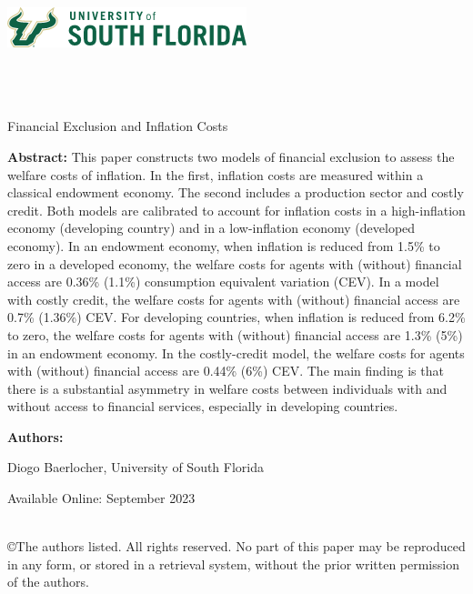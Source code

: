 \documentclass[11pt]{article}
\begin{document}
\onehalfspacing

\noindent \includegraphics{usf_logo.png} \\

\noindent{\color{usfgreen} \rule{0.5\textwidth}{10pt}}{\color{usfgold} \rule{0.5\textwidth}{10pt}}\\

 \\
 \\

\vspace*{0.5in}

\begin{center} 
    \huge Financial Exclusion and Inflation Costs \\
\end{center}

\vspace*{0.5in}

\noindent \textbf{Abstract:} This paper constructs two models of financial exclusion to assess the welfare costs of inflation. In the first, inflation costs are measured within a classical endowment economy. The second includes a production sector and costly credit. Both models are calibrated to account for inflation costs in a high-inflation economy (developing country) and in a low-inflation economy (developed economy). In an endowment economy, when inflation is reduced from 1.5\% to zero in a developed economy, the welfare costs for agents with (without) financial access are 0.36\% (1.1\%) consumption equivalent variation (CEV). In a model with costly credit, the welfare costs for agents with (without) financial access are 0.7\% (1.36\%) CEV. For developing countries, when inflation is reduced from 6.2\% to zero, the welfare costs for agents with (without) financial access are 1.3\% (5\%) in an endowment economy. In the costly-credit model, the welfare costs for agents with (without) financial access are 0.44\% (6\%) CEV. The main finding is that there is a substantial asymmetry in welfare costs between individuals with and without access to financial services, especially in developing countries. 

\vspace*{0.25in}

\noindent \textbf{Authors:}

Diogo Baerlocher, University of South Florida \\

\vspace*{0.25in}


\noindent Available Online: September 2023 %

\vfill 
\noindent{\color{usfgreen} \rule{\textwidth}{5pt}}\\
\noindent \small ©The authors listed. All rights reserved. No part of this paper may be reproduced in any form, or stored in a retrieval system, without the prior written permission of the authors.
\thispagestyle{empty}
\end{document}
